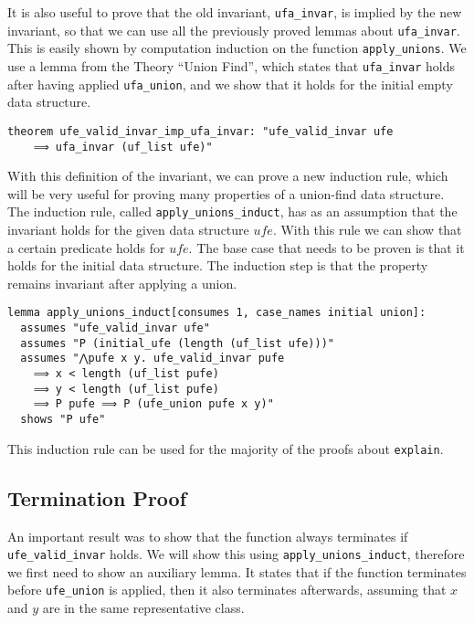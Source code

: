 It is also useful to prove that the old invariant, \lstinline{ufa_invar}, is implied by the new invariant, so that we can use all the previously proved lemmas about \lstinline{ufa_invar}. This is easily shown by computation induction on the function \lstinline{apply_unions}. We use a lemma from the Theory ``Union Find'', which states that \lstinline{ufa_invar} holds after having applied \lstinline{ufa_union}, and we show that it holds for the initial empty data structure.

\begin{lstlisting}
theorem ufe_valid_invar_imp_ufa_invar: "ufe_valid_invar ufe
    ⟹ ufa_invar (uf_list ufe)"
\end{lstlisting}

With this definition of the invariant, we can prove a new induction rule, which will be very useful for proving many properties of a union-find data structure. The induction rule, called \lstinline{apply_unions_induct}, has as an assumption that the invariant holds for the given data structure $ufe$. With this rule we can show that a certain predicate holds for $ufe$. The base case that needs to be proven is that it holds for the initial data structure. The induction step is that the property remains invariant after applying a union.

\begin{lstlisting}
lemma apply_unions_induct[consumes 1, case_names initial union]:
  assumes "ufe_valid_invar ufe"
  assumes "P (initial_ufe (length (uf_list ufe)))"
  assumes "⋀pufe x y. ufe_valid_invar pufe
    ⟹ x < length (uf_list pufe)
    ⟹ y < length (uf_list pufe)
    ⟹ P pufe ⟹ P (ufe_union pufe x y)"
  shows "P ufe"
\end{lstlisting}

This induction rule can be used for the majority of the proofs about \lstinline|explain|.

\subsection{Termination Proof}
\label{subsection:termination}

An important result was to show that the function always terminates if \lstinline{ufe_valid_invar} holds. We will show this using \lstinline|apply_unions_induct|, therefore we first need to show an auxiliary lemma. It states that if the function terminates before \lstinline{ufe_union} is applied, then it also terminates afterwards, assuming that $x$ and $y$ are in the same representative class.

